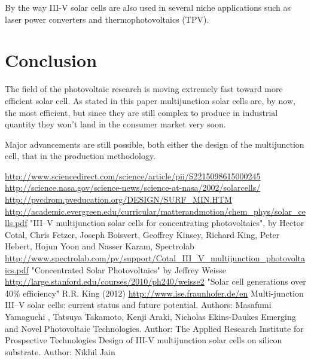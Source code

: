 \documentclass[11pt]{article} %
\begin{document}
 By the way III-V solar cells are also used in several niche applications such as laser power converters and thermophotovoltaics (TPV).
 

\section{Conclusion}

The field of the photovoltaic research is moving extremely fast toward more efficient solar cell. As stated in this paper multijunction solar cells are, by now, the most efficient, but since they are still complex to produce in industrial quantity they won't land in the consumer market very soon.

Major advancements are still possible, both either the design of the multijunction cell, that in the production methodology.

\begin{thebibliography}{9}
\bibitem{}
\url{http://www.sciencedirect.com/science/article/pii/S2215098615000245}
\bibitem{}
\url{http://science.nasa.gov/science-news/science-at-nasa/2002/solarcells/}
\bibitem{}
\url{http://pvcdrom.pveducation.org/DESIGN/SURF_MIN.HTM}
\bibitem{}
\url{http://academic.evergreen.edu/curricular/matterandmotion/chem_phys/solar_cells.pdf}
\bibitem{}
	"III–V multijunction solar cells for concentrating photovoltaics", by Hector Cotal, Chris Fetzer, Joseph Boisvert, Geoffrey Kinsey, Richard King, Peter Hebert, Hojun Yoon and Nasser Karam, Spectrolab \url{http://www.spectrolab.com/pv/support/Cotal_III_V_multijunction_photovoltaics.pdf}
\bibitem{}
	"Concentrated Solar Photovoltaics" by Jeffrey Weisse \url{http://large.stanford.edu/courses/2010/ph240/weisse2}
\bibitem{}
	"Solar cell generations over 40\% efficiency" R.R. King (2012) 
\bibitem{}
	\url{http://www.ise.fraunhofer.de/en}
\bibitem{}
	Multi-junction III–V solar cells: current status and future potential. Authors: Masafumi Yamaguchi , Tatsuya Takamoto, Kenji Araki, Nicholas Ekins-Daukes 
\bibitem{}
	Emerging and Novel Photovoltaic Technologies. Author: The Applied Research Institute for Prospective Technologies  
\bibitem{}
	Design of III-V multijunction solar cells on silicon substrate. Author: Nikhil Jain 

\end{thebibliography}
\end{document}
